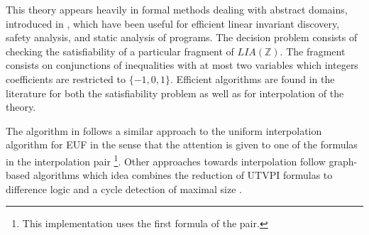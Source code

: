 This theory appears heavily in formal methods dealing
with abstract domains, introduced in 
\cite{journals/corr/abs-cs-0703084}, which have been useful
for efficient linear invariant discovery, safety analysis, and
static analysis of programs.
The decision problem consists of checking the satisfiability
of a particular fragment of $LIA(\mathbb{Z})$. The fragment 
consists on conjunctions of inequalities with at most
two variables which integers coefficients are restricted
to $\{-1, 0, 1\}$. Efficient algorithms are found in the literature 
for both the satisfiability problem \cite{10.1007/11559306_9} as 
well as  for interpolation 
\cite{10.1007/978-3-642-02959-2_15} of the theory. 

The algorithm in \cite{KAPUR2017} follows a similar approach to the
uniform interpolation algorithm for EUF in the sense 
that the attention is given to one of 
the formulas in the interpolation pair \footnote {This implementation uses the first formula of the pair. }.
Other approaches towards interpolation follow graph-based 
algorithms which idea combines the reduction of 
UTVPI formulas to difference 
logic \cite{journals/corr/abs-cs-0703084} and a cycle 
detection of maximal size \cite{10.1007/978-3-642-02959-2_15}.

